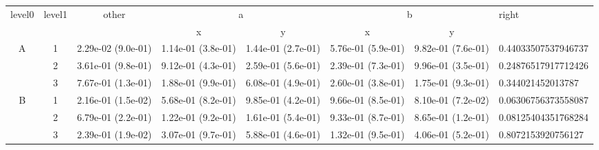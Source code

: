 \begin{tabular}{cccccccl}
\toprule
\multirow{2}{*}{level0} & \multirow{2}{*}{level1}& \multirow{2}{*}{other}&\multicolumn{2}{c}{a}&\multicolumn{2}{c}{b}& \multirow{2}{*}{right}\tabularnewline
\cmidrule(lr){4-5}
\cmidrule(lr){6-7}
&&&x&y&x&y\tabularnewline
\midrule
\multirow{3}{*}{A}&1& 2.29e-02 (9.0e-01)& 1.14e-01 (3.8e-01)& 1.44e-01 (2.7e-01)& 5.76e-01 (5.9e-01)& 9.82e-01 (7.6e-01)& 0.44033507537946737\tabularnewline
&2& 3.61e-01 (9.8e-01)& 9.12e-01 (4.3e-01)& 2.59e-01 (5.6e-01)& 2.39e-01 (7.3e-01)& 9.96e-01 (3.5e-01)& 0.24876517917712426\tabularnewline
&3& 7.67e-01 (1.3e-01)& 1.88e-01 (9.9e-01)& 6.08e-01 (4.9e-01)& 2.60e-01 (3.8e-01)& 1.75e-01 (9.3e-01)& 0.344021452013787\tabularnewline
\midrule
\multirow{3}{*}{B}&1& 2.16e-01 (1.5e-02)& 5.68e-01 (8.2e-01)& 9.85e-01 (4.2e-01)& 9.66e-01 (8.5e-01)& 8.10e-01 (7.2e-02)& 0.06306756373558087\tabularnewline
&2& 6.79e-01 (2.2e-01)& 1.22e-01 (9.2e-01)& 1.61e-01 (5.4e-01)& 9.33e-01 (8.7e-01)& 8.65e-01 (1.2e-01)& 0.08125404351768284\tabularnewline
&3& 2.39e-01 (1.9e-02)& 3.07e-01 (9.7e-01)& 5.88e-01 (4.6e-01)& 1.32e-01 (9.5e-01)& 4.06e-01 (5.2e-01)& 0.8072153920756127\tabularnewline
\bottomrule
\end{tabular}
